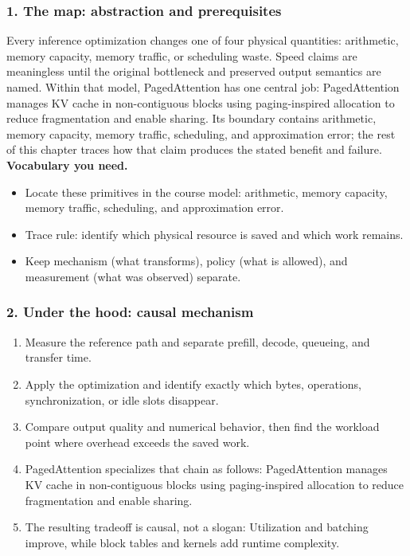 \subsubsection*{1. The map: abstraction and prerequisites}
Every inference optimization changes one of four physical quantities: arithmetic, memory capacity, memory traffic, or scheduling waste. Speed claims are meaningless until the original bottleneck and preserved output semantics are named.
Within that model, PagedAttention has one central job: PagedAttention manages KV cache in non-contiguous blocks using paging-inspired allocation to reduce fragmentation and enable sharing. Its boundary contains arithmetic, memory capacity, memory traffic, scheduling, and approximation error; the rest of this chapter traces how that claim produces the stated benefit and failure.
\textbf{Vocabulary you need.}\begin{itemize}
\item Locate these primitives in the course model: arithmetic, memory capacity, memory traffic, scheduling, and approximation error.
\item Trace rule: identify which physical resource is saved and which work remains.
\item Keep mechanism (what transforms), policy (what is allowed), and measurement (what was observed) separate.
\end{itemize}
\subsubsection*{2. Under the hood: causal mechanism}\begin{enumerate}
\item Measure the reference path and separate prefill, decode, queueing, and transfer time.
\item Apply the optimization and identify exactly which bytes, operations, synchronization, or idle slots disappear.
\item Compare output quality and numerical behavior, then find the workload point where overhead exceeds the saved work.
\item PagedAttention specializes that chain as follows: PagedAttention manages KV cache in non-contiguous blocks using paging-inspired allocation to reduce fragmentation and enable sharing.
\item The resulting tradeoff is causal, not a slogan: Utilization and batching improve, while block tables and kernels add runtime complexity.
\end{enumerate}
